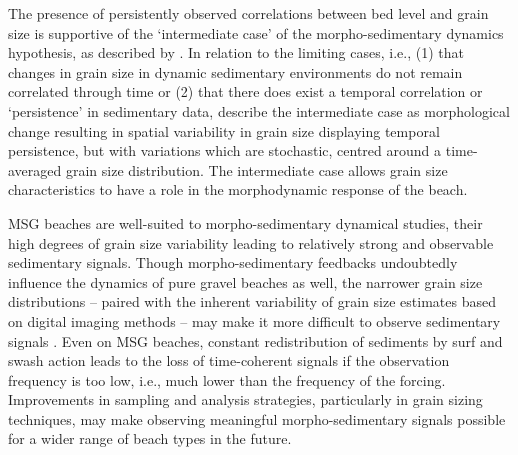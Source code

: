 The presence of persistently observed correlations between bed level and grain size is supportive of the `intermediate case' of the morpho-sedimentary dynamics hypothesis, as described by \citet{Buscombe_Masselink2006}. In relation to the limiting cases, i.e., (1) that changes in grain size in dynamic sedimentary environments do not remain correlated through time or (2) that there does exist a temporal correlation or `persistence' in sedimentary data, \citeauthor{Buscombe_Masselink2006} describe the intermediate case as morphological change resulting in spatial variability in grain size displaying temporal persistence, but with variations which are stochastic, centred around a time-averaged grain size distribution. The intermediate case allows grain size characteristics to have a role in the morphodynamic response of the beach. 

MSG beaches are well-suited to morpho-sedimentary dynamical studies, their high degrees of grain size variability leading to relatively strong and observable sedimentary signals. Though morpho-sedimentary feedbacks undoubtedly influence the dynamics of pure gravel beaches as well, the narrower grain size distributions -- paired with the inherent variability of grain size estimates based on digital imaging methods -- may make it more difficult to observe sedimentary signals \citep[see][]{Austin_Buscombe2008, Masselink_etal2007}. Even on MSG beaches, constant redistribution of sediments by surf and swash action leads to the loss of time-coherent signals if the observation frequency is too low, i.e., much lower than the frequency of the forcing. Improvements in sampling and analysis strategies, particularly in grain sizing techniques, may make observing meaningful morpho-sedimentary signals possible for a wider range of beach types in the future.




